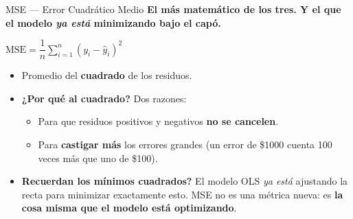 \documentclass[aspectratio=169, 11pt]{beamer}
\begin{document}
\begin{frame}[shrink=5]{MSE --- Error Cuadrático Medio}
  \vspace{-4pt}
  {\footnotesize\color{arcaDark}\bfseries
    El más matemático de los tres. Y el que el modelo \textit{ya está}
    minimizando bajo el capó.}

  \vspace{6pt}
  \begin{center}
    \begin{tcolorbox}[colback=arcaGray, colframe=arcaRed, boxrule=1pt,
                      arc=4pt, width=0.62\textwidth]
    \centering
    \large
    $\text{MSE} = \dfrac{1}{n}\sum_{i=1}^{n}(y_i - \hat{y}_i)^2$
    \end{tcolorbox}
  \end{center}

  \vspace{6pt}
  {\scriptsize
  \begin{itemize}\setlength{\itemsep}{5pt}
    \item[{\color{arcaRed}\faArrowRight}]
      Promedio del \textbf{cuadrado} de los residuos.
    \item[{\color{arcaRed}\faArrowRight}]
      \textbf{¿Por qué al cuadrado?} Dos razones:
      \begin{itemize}
        \item Para que residuos positivos y negativos \textbf{no se cancelen}.
        \item Para \textbf{castigar más} los errores grandes (un error de
          \$1000 cuenta 100 veces más que uno de \$100).
      \end{itemize}
    \item[{\color{codeOrange}\faExclamationTriangle}]
      \textbf{Recuerdan los mínimos cuadrados?} El modelo OLS \textit{ya
      está} ajustando la recta para minimizar exactamente esto. MSE no
      es una métrica nueva: es \textbf{la cosa misma que el modelo está
      optimizando}.
  \end{itemize}
  }
\end{frame}
\end{document}
